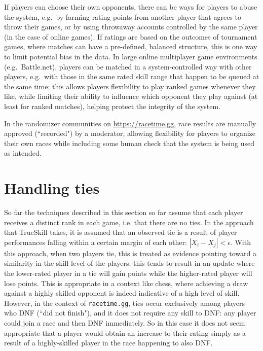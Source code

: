 \documentclass{article}
\begin{document}
	If players can choose their own opponents, there can be ways for players to abuse the system, e.g.\ by farming rating points from another player that agrees to throw their games, or by using throwaway accounts controlled by the same player (in the case of online games). If ratings are based on the outcomes of tournament games, where matches can have a pre-defined, balanced structure, this is one way to limit potential bias in the data. In large online multiplayer game environments (e.g.\ Battle.net), players can be matched in a system-controlled way with other players, e.g.\ with those in the same rated skill range that happen to be queued at the same time; this allows players flexibility to play ranked games whenever they like, while limiting their ability to influence which opponent they play against (at least for ranked matches), helping protect the integrity of the system.
	
	In the randomizer communities on \url{https://racetime.gg}, race results are manually approved (``recorded") by a moderator, allowing flexibility for players to organize their own races while including some human check that the system is being used as intended.
	
	\section{Handling ties}
	\label{ref:ties}
	So far the techniques described in this section so far assume that each player receives a distinct rank in each game, i.e. that there are no ties. 
	In the approach that TrueSkill takes, it is assumed that an observed tie is a result of player performances falling within a certain margin of each other: $|X_i - X_j| < \epsilon$. With this approach, when two players tie, this is treated as evidence pointing toward a similarity in the skill level of the players:
	this tends to result in an update where the lower-rated player in a tie will gain points while the higher-rated player will lose points. This is appropriate
	in a context like chess, where achieving a draw against a highly skilled opponent is indeed indicative of a high level of skill. However, in the context of \texttt{racetime.gg}, ties occur exclusively among players who DNF (``did not finish"), and it does not require any skill to DNF: any player could join a race and then DNF immediately. So in this case it does not seem appropriate that a player would obtain an increase to their rating simply as a result of a highly-skilled player in the race happening to also DNF.
	
\end{document}
